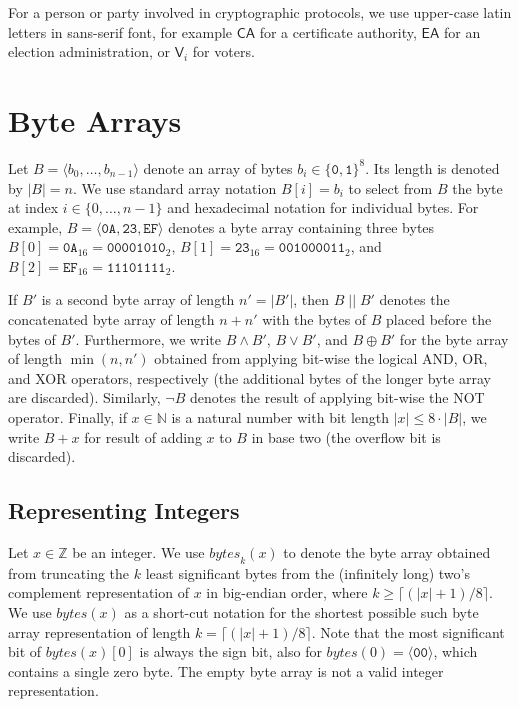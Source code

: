 \documentclass[bibtotoc,halfparskip,oneside]{scrreprt}
\newcommand{\hex}[1]{\ensuremath{\mathtt{#1}}}
\newcommand{\HEX}[1]{\ensuremath{\mathtt{#1}_{16}}}
\newcommand{\bin}[1]{\ensuremath{\mathtt{#1}}}
\newcommand{\BIN}[1]{\ensuremath{\mathtt{#1}_{2}}}
\newcommand{\conc}{\ensuremath{\;||\;}}
\newcommand{\CA}{\ensuremath{\mathsf{CA}}\xspace}
\newcommand{\EA}{\ensuremath{\mathsf{EA}}\xspace}
\newcommand{\Voter}[1]{\ensuremath{\mathsf{V}_{#1}}\xspace}
\begin{document}
	For a person or party involved in cryptographic protocols, we use upper-case latin letters in sans-serif font, for example \CA for a certificate authority, \EA for an election administration, or \Voter{i} for voters.
	
	\section{Byte Arrays}
	
	Let $B=\langle b_0,\ldots,b_{n-1}\rangle$ denote an array of bytes $b_i\in\{\bin{0},\bin{1}\}^8$. Its length is denoted by $|B|=n$. We use standard array notation $B[i]=b_i$ to select from $B$ the byte at index $i\in\{0,\ldots,n-1\}$ and hexadecimal notation for individual bytes. For example, $B=\langle \hex{0A},\hex{23},\hex{EF}\rangle$ denotes a byte array containing three bytes $B[0]=\HEX{0A}=\BIN{00001010}$, $B[1]=\HEX{23}=\BIN{001000011}$, and $B[2]=\HEX{EF}=\BIN{11101111}$.
	
	If $B'$ is a second byte array of length $n'=|B'|$, then $B\conc B'$ denotes the concatenated byte array of length $n+n'$ with the bytes of $B$ placed before the bytes of $B'$. Furthermore, we write $B\wedge B'$, $B\vee B'$, and $B \oplus B'$ for the byte array of length $\min(n,n')$ obtained from applying bit-wise the logical AND, OR, and XOR operators, respectively (the additional bytes of the longer byte array are discarded). Similarly, $\neg B$ denotes the result of applying bit-wise the NOT operator. Finally, if $x\in\mathbb{N}$ is a natural number with bit length $|x|\leq 8{\cdot}|B|$, we write $B+x$ for result of adding $x$ to $B$ in base two (the overflow bit is discarded).
	
	\subsection{Representing Integers}
	Let $x\in \mathbb{Z}$ be an integer. We use $\mathit{bytes}_k(x)$ to denote the byte array obtained from truncating the $k$ least significant bytes from the (infinitely long) two's complement representation of $x$ in big-endian order, where $k\geq \lceil(|x|+1)/8\rceil$. We use $\mathit{bytes}(x)$ as a short-cut notation for the shortest possible such byte array representation of length $k=\lceil(|x|+1)/8\rceil$. Note that the most significant bit of $\mathit{bytes}(x)[0]$ is always the sign bit, also for $\mathit{bytes}(0)=\langle\hex{00}\rangle$, which contains a single zero byte. The empty byte array is not a valid integer representation.
	
\end{document}
